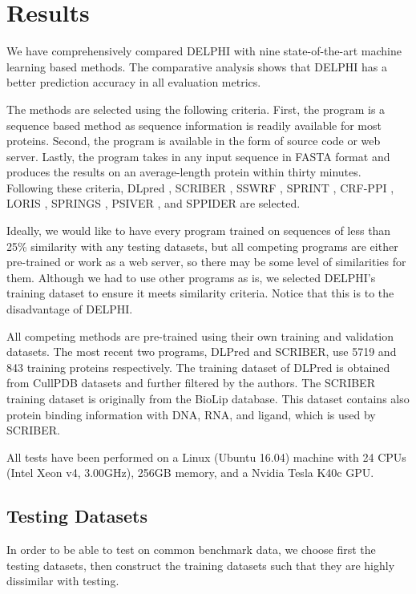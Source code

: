 \section{Results}
We have comprehensively compared DELPHI with nine state-of-the-art machine learning based methods. The comparative analysis shows that DELPHI has a better prediction accuracy in all evaluation metrics. 

The methods are selected using the following criteria. First, the program is a sequence based method as sequence information is readily available for most proteins. Second, the program is available in the form of source code or web server. Lastly, the program takes in any input sequence in FASTA format and produces the results on an average-length protein within thirty minutes. Following these criteria, DLpred \cite{zhang2019sequence}, SCRIBER \cite{zhang2019scriber}, SSWRF \cite{wei2016protein}, SPRINT \cite{taherzadeh2016sequence}, CRF-PPI \cite{wei2015cascade}, LORIS \cite{dhole2014sequence}, SPRINGS \cite{singh2014springs}, PSIVER \cite{murakami2010applying}, and SPPIDER \cite{porollo2007prediction} are selected.

Ideally, we would like to have every program trained on sequences of less than 25\% similarity with any testing datasets, but all competing programs are either pre-trained or work as a web server, so there may be some level of similarities for them. Although we had to use other programs as is, we selected DELPHI's training dataset to ensure it meets similarity criteria. Notice that this is to the disadvantage of DELPHI.

All competing methods are pre-trained using their own training and validation datasets. The most recent two programs, DLPred and SCRIBER, use 5719 and 843 training proteins respectively. The training dataset of DLPred is obtained from CullPDB datasets \cite{wang2003pisces} and further filtered by the authors. The SCRIBER training dataset is originally from the BioLip database. This dataset contains also protein binding information with DNA, RNA, and ligand, which is used by SCRIBER.

All tests have been performed on a Linux (Ubuntu 16.04) machine with 24 CPUs (Intel Xeon v4, 3.00GHz), 256GB memory, and a Nvidia Tesla K40c GPU.
\subsection{Testing Datasets \label{testing_data}}
In order to be able to test on common benchmark data, we choose first the testing datasets, then construct the training datasets such that they are highly dissimilar with testing.

